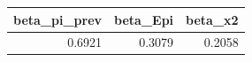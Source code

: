 \begin{tabular}{rrr}
\toprule
beta_pi_prev & beta_Epi & beta_x2 \\
\midrule
0.6921 & 0.3079 & 0.2058 \\
\bottomrule
\end{tabular}
